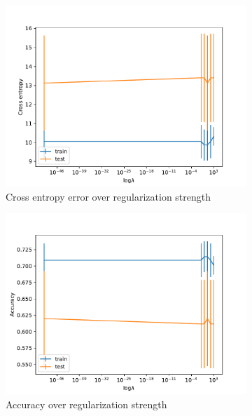 \documentclass[11pt]{amsart}
\begin{document}
\begin{figure}[h!]
    \centering
    \begin{subfigure}{0.45\textwidth}
        \includegraphics[width=\textwidth]{q1d_crossentropy.pdf}
        \caption{Cross entropy error over regularization strength}
        \label{fig:rnamutsnomfe_freq}
    \end{subfigure}
    \begin{subfigure}{0.45\textwidth}
        \includegraphics[width=\textwidth]{q1d_accuracy.pdf}
        \caption{Accuracy over regularization strength}
        \label{fig:ranmutsnomfe_freq}
    \end{subfigure}
    \begin{subfigure}{0.45\textwidth}

\end{subfigure}
\end{figure}
\end{document}

